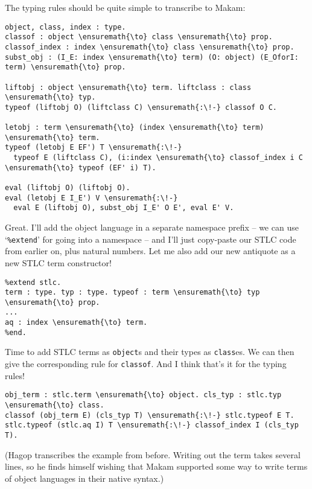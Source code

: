 The typing rules should be quite simple to transcribe to Makam:

\begin{verbatim}
object, class, index : type.
classof : object \ensuremath{\to} class \ensuremath{\to} prop.
classof_index : index \ensuremath{\to} class \ensuremath{\to} prop.
subst_obj : (I_E: index \ensuremath{\to} term) (O: object) (E_OforI: term) \ensuremath{\to} prop.

liftobj : object \ensuremath{\to} term. liftclass : class \ensuremath{\to} typ.
typeof (liftobj O) (liftclass C) \ensuremath{:\!-} classof O C.

letobj : term \ensuremath{\to} (index \ensuremath{\to} term) \ensuremath{\to} term.
typeof (letobj E EF') T \ensuremath{:\!-}
  typeof E (liftclass C), (i:index \ensuremath{\to} classof_index i C \ensuremath{\to} typeof (EF' i) T).

eval (liftobj O) (liftobj O).
eval (letobj E I_E') V \ensuremath{:\!-}
  eval E (liftobj O), subst_obj I_E' O E', eval E' V.
\end{verbatim}

\heroADVISOR{} Great. I'll add the object language in a separate namespace
prefix -- we can use `\texttt{\%extend}' for going into a namespace --
and I'll just copy-paste our STLC code from earlier on, plus natural
numbers. Let me also add our new antiquote as a new STLC term
constructor!

\begin{verbatim}
%extend stlc.
term : type. typ : type. typeof : term \ensuremath{\to} typ \ensuremath{\to} prop.
...
aq : index \ensuremath{\to} term.
%end.
\end{verbatim}

\heroSTUDENT{} Time to add STLC terms as \texttt{object}s and their types as
\texttt{class}es. We can then give the corresponding rule for
\texttt{classof}. And I think that's it for the typing rules!

\begin{verbatim}
obj_term : stlc.term \ensuremath{\to} object. cls_typ : stlc.typ \ensuremath{\to} class.
classof (obj_term E) (cls_typ T) \ensuremath{:\!-} stlc.typeof E T.
stlc.typeof (stlc.aq I) T \ensuremath{:\!-} classof_index I (cls_typ T).
\end{verbatim}

\begin{scenecomment}
(Hagop transcribes the example from before. Writing out the term takes several lines, so he finds himself
wishing that Makam supported some way to write terms of object languages in their native syntax.)
\end{scenecomment}

